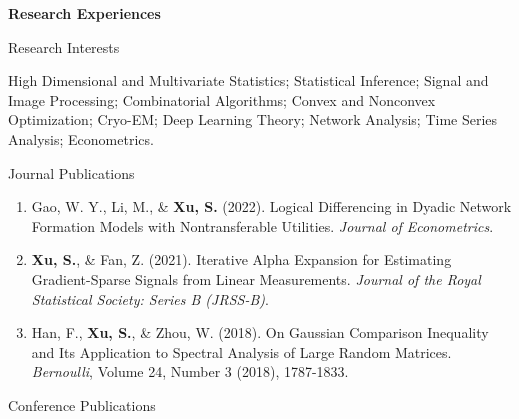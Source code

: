 \documentclass{article}
\begin{document}



\vspace{5mm}
\begin{large}
\noindent \textbf{Research Experiences}
\end{large}
\vspace{5mm}

\begin{large}
\noindent Research Interests
\end{large}

\vspace{3mm}



High Dimensional and Multivariate Statistics; Statistical Inference; Signal and Image Processing; Combinatorial Algorithms; Convex and Nonconvex Optimization; Cryo-EM; Deep Learning Theory; Network Analysis; Time Series Analysis; Econometrics.

\vspace{3mm}

\begin{large}
\noindent Journal Publications
\end{large}

\begin{enumerate}
\item Gao, W. Y., Li, M., \& \textbf{Xu, S.} (2022). Logical Differencing in Dyadic Network Formation Models with Nontransferable Utilities. \emph{Journal of Econometrics}.
\item \textbf{Xu, S.}, \& Fan, Z. (2021). Iterative Alpha Expansion for Estimating Gradient-Sparse Signals from Linear Measurements. \emph{Journal of the Royal Statistical Society: Series B (JRSS-B)}.
\item Han, F., \textbf{Xu, S.}, \& Zhou, W. (2018). On Gaussian Comparison Inequality and Its Application to Spectral Analysis of Large Random Matrices. \emph{Bernoulli}, Volume 24, Number 3 (2018), 1787-1833.
\end{enumerate}


\begin{large}
\noindent Conference Publications
\end{large}
\end{document}
